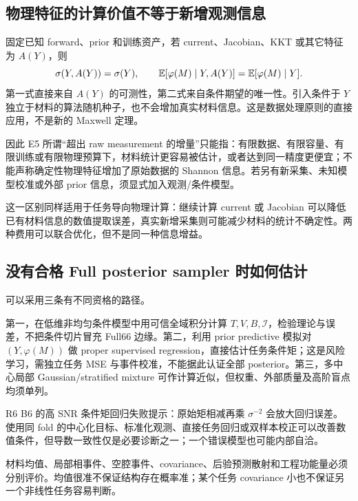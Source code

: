 \subsection{物理特征的计算价值不等于新增观测信息}
固定已知 forward、prior 和训练资产，若 current、Jacobian、KKT 或其它特征为 $A(Y)$，则
\[
\sigma(Y,A(Y))=\sigma(Y),\qquad
\mathbb E[\varphi(M)\mid Y,A(Y)]=\mathbb E[\varphi(M)\mid Y].
\]
第一式直接来自 $A(Y)$ 的可测性，第二式来自条件期望的唯一性。引入条件于 $Y$ 独立于材料的算法随机种子，也不会增加真实材料信息。这是数据处理原则的直接应用，不是新的 Maxwell 定理。

因此 E5 所谓“超出 raw measurement 的增量”只能指：有限数据、有限容量、有限训练或有限物理预算下，材料统计更容易被估计，或者达到同一精度更便宜；不能声称确定性物理特征增加了原始数据的 Shannon 信息。若另有新采集、未知模型校准或外部 prior 信息，须显式加入观测/条件模型。

这一区别同样适用于任务导向物理计算：继续计算 current 或 Jacobian 可以降低已有材料信息的数值提取误差，真实新增采集则可能减少材料的统计不确定性。两种费用可以联合优化，但不是同一种信息增益。

\subsection{没有合格 Full posterior sampler 时如何估计}
可以采用三条有不同资格的路径。

第一，在低维非均匀条件模型中用可信全域积分计算 $T,V,B,\mathcal I$，检验理论与误差，不把条件切片冒充 Full66 边缘。第二，利用 prior predictive 模拟对 $(Y,\varphi(M))$ 做 proper supervised regression，直接估计任务条件矩；这是风险学习，需独立任务 MSE 与事件校准，不能据此认证全部 posterior。第三，多中心局部 Gaussian/stratified mixture 可作计算近似，但权重、外部质量及高阶盲点均须单列。

R6 B6 的高 SNR 条件矩回归失败提示：原始矩相减再乘 $\sigma^{-2}$ 会放大回归误差。使用同 fold 的中心化目标、标准化观测、直接任务回归或双样本校正可以改善数值条件，但导数一致性仅是必要诊断之一；一个错误模型也可能内部自洽。

材料均值、局部相事件、空腔事件、covariance、后验预测散射和工程功能量必须分别评价。均值很准不保证结构存在概率准；某个任务 covariance 小也不保证另一个非线性任务容易判断。

